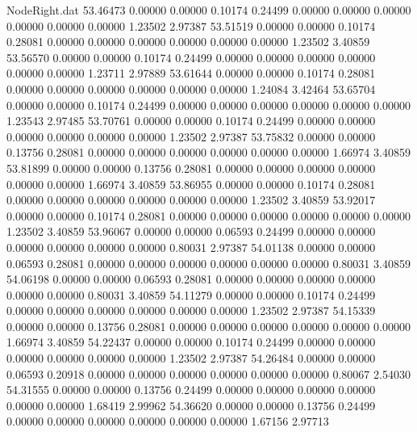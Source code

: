 \begin{filecontents}{NodeRight.dat}
  53.46473    0.00000    0.00000     0.10174    0.24499    0.00000    0.00000    0.00000    0.00000    0.00000    0.00000    1.23502    2.97387
  53.51519    0.00000    0.00000     0.10174    0.28081    0.00000    0.00000    0.00000    0.00000    0.00000    0.00000    1.23502    3.40859
  53.56570    0.00000    0.00000     0.10174    0.24499    0.00000    0.00000    0.00000    0.00000    0.00000    0.00000    1.23711    2.97889
  53.61644    0.00000    0.00000     0.10174    0.28081    0.00000    0.00000    0.00000    0.00000    0.00000    0.00000    1.24084    3.42464
  53.65704    0.00000    0.00000     0.10174    0.24499    0.00000    0.00000    0.00000    0.00000    0.00000    0.00000    1.23543    2.97485
  53.70761    0.00000    0.00000     0.10174    0.24499    0.00000    0.00000    0.00000    0.00000    0.00000    0.00000    1.23502    2.97387
  53.75832    0.00000    0.00000     0.13756    0.28081    0.00000    0.00000    0.00000    0.00000    0.00000    0.00000    1.66974    3.40859
  53.81899    0.00000    0.00000     0.13756    0.28081    0.00000    0.00000    0.00000    0.00000    0.00000    0.00000    1.66974    3.40859
  53.86955    0.00000    0.00000     0.10174    0.28081    0.00000    0.00000    0.00000    0.00000    0.00000    0.00000    1.23502    3.40859
  53.92017    0.00000    0.00000     0.10174    0.28081    0.00000    0.00000    0.00000    0.00000    0.00000    0.00000    1.23502    3.40859
  53.96067    0.00000    0.00000     0.06593    0.24499    0.00000    0.00000    0.00000    0.00000    0.00000    0.00000    0.80031    2.97387
  54.01138    0.00000    0.00000     0.06593    0.28081    0.00000    0.00000    0.00000    0.00000    0.00000    0.00000    0.80031    3.40859
  54.06198    0.00000    0.00000     0.06593    0.28081    0.00000    0.00000    0.00000    0.00000    0.00000    0.00000    0.80031    3.40859
  54.11279    0.00000    0.00000     0.10174    0.24499    0.00000    0.00000    0.00000    0.00000    0.00000    0.00000    1.23502    2.97387
  54.15339    0.00000    0.00000     0.13756    0.28081    0.00000    0.00000    0.00000    0.00000    0.00000    0.00000    1.66974    3.40859
  54.22437    0.00000    0.00000     0.10174    0.24499    0.00000    0.00000    0.00000    0.00000    0.00000    0.00000    1.23502    2.97387
  54.26484    0.00000    0.00000     0.06593    0.20918    0.00000    0.00000    0.00000    0.00000    0.00000    0.00000    0.80067    2.54030
  54.31555    0.00000    0.00000     0.13756    0.24499    0.00000    0.00000    0.00000    0.00000    0.00000    0.00000    1.68419    2.99962
  54.36620    0.00000    0.00000     0.13756    0.24499    0.00000    0.00000    0.00000    0.00000    0.00000    0.00000    1.67156    2.97713

\end{filecontents}
